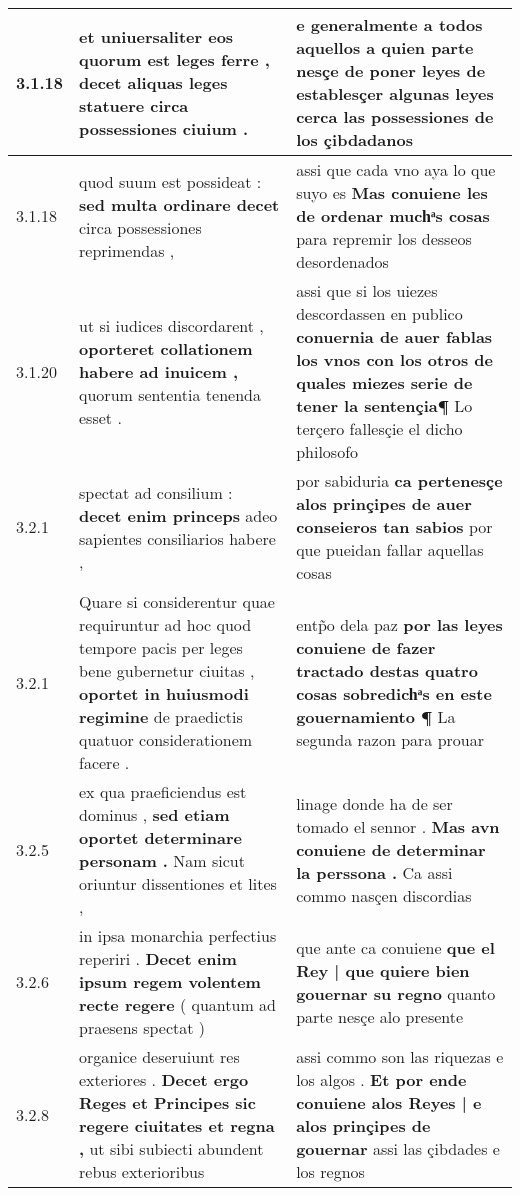 \begin{tabular}{|p{1cm}|p{6.5cm}|p{6.5cm}|}
3.1.18 & et uniuersaliter eos quorum est leges ferre , \textbf{ decet aliquas leges statuere } circa possessiones ciuium . & e generalmente a todos aquellos \textbf{ a quien parte nesçe de poner leyes de establesçer algunas leyes } cerca las possessiones de los çibdadanos \\\hline
3.1.18 & quod suum est possideat : \textbf{ sed multa ordinare decet } circa possessiones reprimendas , & assi que cada vno aya lo que suyo es \textbf{ Mas conuiene les de ordenar muchͣs cosas } para repremir los desseos desordenados \\\hline
3.1.20 & ut si iudices discordarent , \textbf{ oporteret collationem habere ad inuicem , } quorum sententia tenenda esset . & assi que si los uiezes descordassen en publico \textbf{ conuernia de auer fablas los vnos con los otros de quales miezes serie de tener la sentençia¶ } Lo terçero fallesçie el dicho philosofo \\\hline
3.2.1 & spectat ad consilium : \textbf{ decet enim princeps } adeo sapientes consiliarios habere , & por sabiduria \textbf{ ca pertenesçe alos prinçipes de auer conseieros tan sabios } por que pueidan fallar aquellas cosas \\\hline
3.2.1 & Quare si considerentur quae requiruntur ad hoc quod tempore pacis per leges bene gubernetur ciuitas , \textbf{ oportet in huiusmodi regimine } de praedictis quatuor considerationem facere . & entp̃o dela paz \textbf{ por las leyes conuiene de fazer tractado destas quatro cosas sobredichͣs en este gouernamiento ¶ } La segunda razon para prouar \\\hline
3.2.5 & ex qua praeficiendus est dominus , \textbf{ sed etiam oportet determinare personam . } Nam sicut oriuntur dissentiones et lites , & linage donde ha de ser tomado el sennor . \textbf{ Mas avn conuiene de determinar la perssona . } Ca assi commo nasçen discordias \\\hline
3.2.6 & in ipsa monarchia perfectius reperiri . \textbf{ Decet enim ipsum regem volentem recte regere } ( quantum ad praesens spectat ) & que ante ca conuiene \textbf{ que el Rey | que quiere bien gouernar su regno } quanto parte nesçe alo presente \\\hline
3.2.8 & organice deseruiunt res exteriores . \textbf{ Decet ergo Reges et Principes sic regere ciuitates et regna , } ut sibi subiecti abundent rebus exterioribus & assi commo son las riquezas e los algos . \textbf{ Et por ende conuiene alos Reyes | e alos prinçipes de gouernar } assi las çibdades e los regnos \\\hline

\end{tabular}
